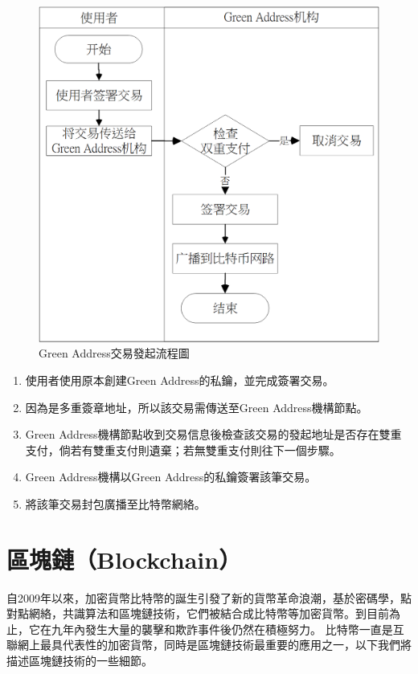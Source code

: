 			 	\begin{figure}[htbp]
					\centering
					\includegraphics[width = .7\textwidth]{gatx.png}
					\caption{Green Address交易發起流程圖}\label{gatx}
				\end{figure}

				\begin{enumerate}
					\item 使用者使用原本創建Green Address的私鑰，並完成簽署交易。
					\item 因為是多重簽章地址，所以該交易需傳送至Green Address機構節點。
					\item Green Address機構節點收到交易信息後檢查該交易的發起地址是否存在雙重支付，倘若有雙重支付則遺棄；若無雙重支付則往下一個步驟。
					\item Green Address機構以Green Address的私鑰簽署該筆交易。
					\item 將該筆交易封包廣播至比特幣網絡。
				\end{enumerate}

		\section{區塊鏈（Blockchain）}
		自2009年以來，加密貨幣比特幣的誕生引發了新的貨幣革命浪潮，基於密碼學，點對點網絡，共識算法和區塊鏈技術，它們被結合成比特幣等加密貨幣。到目前為止，它在九年內發生大量的襲擊和欺詐事件後仍然在積極努力。 比特幣一直是互聯網上最具代表性的加密貨幣，同時是區塊鏈技術最重要的應用之一，以下我們將描述區塊鏈技術的一些細節。

